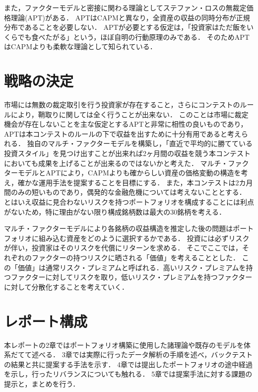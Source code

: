 \documentclass[11pt]{jreport}
\begin{document}
また，ファクターモデルと密接に関わる理論としてステファン・ロスの無裁定価格理論(APT)\cite{Ross}がある．
APTはCAPMと異なり，全資産の収益の同時分布が正規分布であることを必要しない．
APTが必要とする仮定は，「投資家はただ飯をいくらでも食べたがる」という，ほぼ自明の行動原理のみである\cite{analyst}．
そのためAPTはCAPMよりも柔軟な理論として知られている．

\section{戦略の決定}

市場には無数の裁定取引を行う投資家が存在すること，さらにコンテストのルールにより，鞘取りに関しては全く行うことが出来ない．
このことは市場に裁定機会が存在しないことを主な仮定とするAPTと非常に相性の良いものであり，APTは本コンテストのルールの下で収益を出すために十分有用であると考えられる．
独自のマルチ・ファクターモデルを構築し，「直近で平均的に勝てている投資スタイル」を見つけ出すことが出来れば2ヶ月間の収益を競う本コンテストにおいても成果を上げることが出来るのではないかと考えた．
マルチ・ファクターモデルとAPTにより，CAPMよりも確からしい資産の価格変動の構造を考え，確かな運用手法を提案することを目標にする．
また，本コンテストは2カ月間のみの短いものであり，偶発的な金融危機については考えないこととする．
とはいえ収益に見合わないリスクを持つポートフォリオを構成することには利点がないため，特に理由がない限り構成銘柄数は最大の30銘柄を考える．

マルチ・ファクターモデルにより各銘柄の収益構造を推定した後の問題はポートフォリオに組み込む資産をどのように選択するかである．
投資には必ずリスクが伴い，投資家はそのリスクを代償にリターンを求める．
そこでここでは，それぞれのファクターの持つリスクに晒される「価値」を考えることとした．
この「価値」は通常リスク・プレミアムと呼ばれる．高いリスク・プレミアムを持つファクターに対してリスクを取り，低いリスク・プレミアムを持つファクターに対して分散化することを考えていく．

\section{レポート構成}
本レポートの2章ではポートフォリオ構築に使用した諸理論や既存のモデルを体系だてて述べる．
3章では実際に行ったデータ解析の手順を述べ，バックテストの結果と共に提案する手法を示す．
4章では提出したポートフォリオの途中経過を示し，行ったリバランスについても触れる．
5章では提案手法に対する課題の提示と，まとめを行う．
\end{document}
